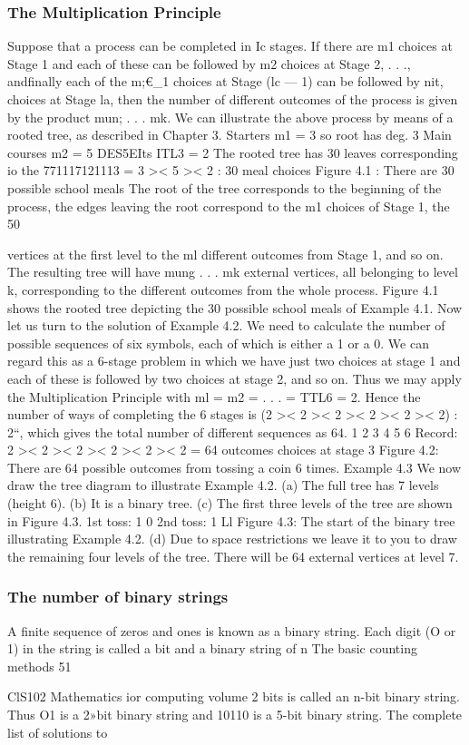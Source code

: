 \documentclass{beamer}
\begin{document}
\begin{frame}
\frametitle{The Multiplication Principle}
Suppose that a process can be completed in Ic stages. If there are m1
choices at Stage 1 and each of these can be followed by m2 choices at
Stage 2, . . ., andﬁnally each of the m;€_1 choices at Stage (lc — 1) can
be followed by nit, choices at Stage la, then the number of different
outcomes of the process is given by the product mun; . . . mk.
We can illustrate the above process by means of a rooted tree, as
described in Chapter 3.
Starters
m1 = 3
so root has deg. 3
Main courses
m2 = 5
DES5EIts
ITL3 = 2
The rooted tree has 30 leaves
corresponding io the 771117121113 = 3 >< 5 >< 2 : 30 meal choices
Figure 4.1 : There are 30 possible school meals
The root of the tree corresponds to the beginning of the process, the
edges leaving the root correspond to the m1 choices of Stage 1, the
50



vertices at the ﬁrst level to the ml different outcomes from Stage 1,
and so on. The resulting tree will have mung . . . mk external
vertices, all belonging to level k, corresponding to the different
outcomes from the whole process. Figure 4.1 shows the rooted tree
depicting the 30 possible school meals of Example 4.1.
Now let us turn to the solution of Example 4.2. We need to calculate
the number of possible sequences of six symbols, each of which is
either a 1 or a 0. We can regard this as a 6-stage problem in which
we have just two choices at stage 1 and each of these is followed by
two choices at stage 2, and so on. Thus we may apply the
Multiplication Principle with ml = m2 = . . . = TTL6 = 2.
Hence the number of ways of completing the 6 stages is
(2 >< 2 >< 2 >< 2 >< 2 >< 2) : 2“, which gives the total number of
different sequences as 64.
1 2 3 4 5 6
Record: 2 >< 2 >< 2 >< 2 >< 2 >< 2 = 64 outcomes
choices at stage 3
Figure 4.2: There are 64 possible outcomes from tossing a coin 6 times.
Example 4.3 We now draw the tree diagram to illustrate Example 4.2.
(a) The full tree has 7 levels (height 6).
(b) It is a binary tree.
(c) The ﬁrst three levels of the tree are shown in Figure 4.3.
1st toss: 1 0
2nd toss: 1 Ll
Figure 4.3: The start of the binary tree illustrating Example 4.2.
(d) Due to space restrictions we leave it to you to draw the
remaining four levels of the tree. There will be 64 external
vertices at level 7.
\end{frame}
\begin{frame}
\frametitle{The number of binary strings}
A ﬁnite sequence of zeros and ones is known as a binary string.
Each digit (O or 1) in the string is called a bit and a binary string of n
The basic counting methods
51



ClS102 Mathematics ior computing volume 2
bits is called an n-bit binary string. Thus O1 is a 2»bit binary string
and 10110 is a 5-bit binary string. The complete list of solutions to
\end{frame}
\end{document}
